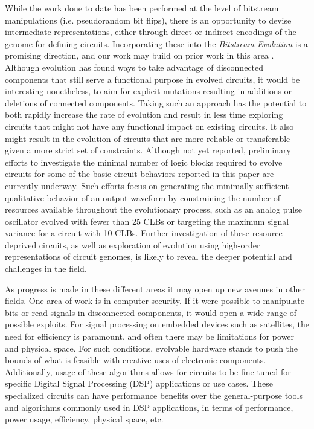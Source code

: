 \documentclass{ieeeaccess}
\begin{document}
While the work done to date has been performed at the level of bitstream manipulations (i.e. pseudorandom bit flips), there is an opportunity to devise intermediate representations, either through direct or indirect encodings of the genome for defining circuits. Incorporating these into the \textit{Bitstream Evolution} is a promising direction, and our work may build on prior work in this area \cite{Shanthi2009PracticalCircuits,Torresen2002AHardware,Gordon2005}. Although evolution has found ways to take advantage of disconnected components that still serve a functional purpose in evolved circuits, it would be interesting nonetheless, to aim for explicit mutations resulting in additions or deletions of connected components. Taking such an approach has the potential to both rapidly increase the rate of evolution and result in less time exploring circuits that might not have any functional impact on existing circuits. It also might result in the evolution of circuits that are more reliable or transferable given a more strict set of constraints. Although not yet reported, preliminary efforts to investigate the minimal number of logic blocks required to evolve circuits for some of the basic circuit behaviors reported in this paper are currently underway. Such efforts focus on generating the minimally sufficient qualitative behavior of an output waveform by constraining the number of resources available throughout the evolutionary process, such as an analog pulse oscillator evolved with fewer than 25 CLBs or targeting the maximum signal variance for a circuit with 10 CLBs. Further investigation of these resource deprived circuits, as well as exploration of evolution using high-order representations of circuit genomes, is likely to reveal the deeper potential and challenges in the field.


As progress is made in these different areas it may open up new avenues in other fields. One area of work is in computer security. If it were possible to manipulate bits or read signals in disconnected components, it would open a wide range of possible exploits. For signal processing on embedded devices such as satellites, the need for efficiency is paramount, and often there may be limitations for power and physical space. For such conditions, evolvable hardware stands to push the bounds of what is feasible with creative uses of electronic components. Additionally, usage of these algorithms allows for circuits to be fine-tuned for specific Digital Signal Processing (DSP) applications or use cases. These specialized circuits can have performance benefits over the general-purpose tools and algorithms commonly used in DSP applications, in terms of performance, power usage, efficiency, physical space, etc.
\end{document}
